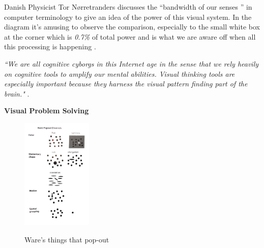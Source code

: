\documentclass[a4paper,11pt,titlepage]{article}
\begin{document}
		\par 
		Danish Physicist Tor Nørretranders discusses the ``bandwidth of our senses ” in computer terminology to give an idea of the power of this visual system. In the diagram it's amusing to observe the comparison, especially to the small white box at the corner which is \textit{0.7\%} of total power and is what we are aware off when all this processing is happening \cite{Tufte2012}.		
		\par 
		\textit{``We are all cognitive cyborgs in this Internet age in the sense that we rely heavily on cognitive tools to amplify our mental abilities. Visual thinking tools are especially important because they harness the visual pattern finding part of the brain."} \cite{Ware2010}.
		\par 

\textbf{Visual Problem Solving}
	  		 
  		\begin{figure}[H]
    			\centering	
			{{\includegraphics[width=0.3\textwidth]
    				{img/ware_popout_channels.png} 
    			}}%
    			\caption{Ware's things that pop-out}%
    		\label{fig:Ware Pop-Out}
		\end{figure}
  		 
\end{document}
